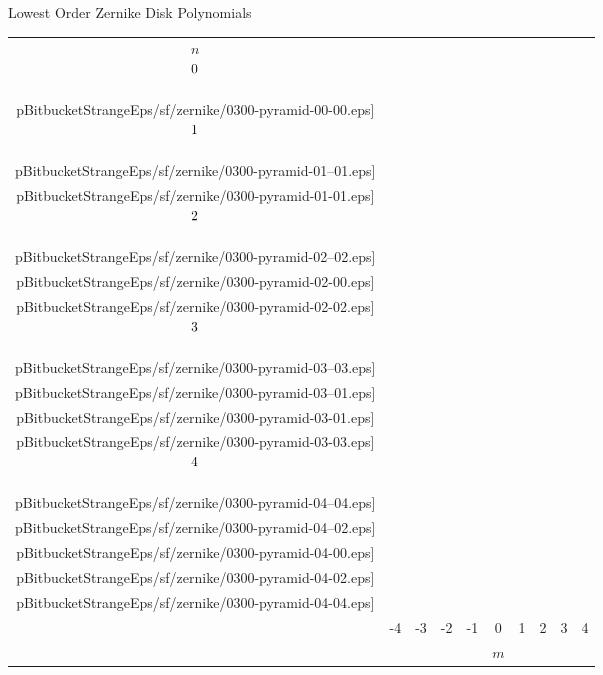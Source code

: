 % 

\begin{frame}{Lowest Order Zernike Disk Polynomials}
    \centering
  	\setlength\extrarowheight{-6pt}
    \setlength{\tabcolsep}{3pt}       %
    \begin{tabular}{cccccccccc}
				$n$ \\
 				$\raisebox{12pt}{0}$  &
        & & & & \texttt{[image: \\pBitbucketStrangeEps/sf/zernike/0300-pyramid-00-00.eps]} & & & & \\[-4pt]
 				$\raisebox{12pt}{1}$  &
        & & & \texttt{[image: \\pBitbucketStrangeEps/sf/zernike/0300-pyramid-01--01.eps]} &
        & \texttt{[image: \\pBitbucketStrangeEps/sf/zernike/0300-pyramid-01-01.eps]} & & & \\[-4pt]
 				$\raisebox{12pt}{2}$  &
        & & \texttt{[image: \\pBitbucketStrangeEps/sf/zernike/0300-pyramid-02--02.eps]} &
        & \texttt{[image: \\pBitbucketStrangeEps/sf/zernike/0300-pyramid-02-00.eps]} &
        & \texttt{[image: \\pBitbucketStrangeEps/sf/zernike/0300-pyramid-02-02.eps]} & & \\[-4pt]
 				$\raisebox{12pt}{3}$  &
        & \texttt{[image: \\pBitbucketStrangeEps/sf/zernike/0300-pyramid-03--03.eps]} &
        & \texttt{[image: \\pBitbucketStrangeEps/sf/zernike/0300-pyramid-03--01.eps]} &
        & \texttt{[image: \\pBitbucketStrangeEps/sf/zernike/0300-pyramid-03-01.eps]} &
        & \texttt{[image: \\pBitbucketStrangeEps/sf/zernike/0300-pyramid-03-03.eps]} & \\[-4pt]
				$\raisebox{12pt}{4}$  &
        \texttt{[image: \\pBitbucketStrangeEps/sf/zernike/0300-pyramid-04--04.eps]} &
        & \texttt{[image: \\pBitbucketStrangeEps/sf/zernike/0300-pyramid-04--02.eps]} &
        & \texttt{[image: \\pBitbucketStrangeEps/sf/zernike/0300-pyramid-04-00.eps]} &
        & \texttt{[image: \\pBitbucketStrangeEps/sf/zernike/0300-pyramid-04-02.eps]} &
        & \texttt{[image: \\pBitbucketStrangeEps/sf/zernike/0300-pyramid-04-04.eps]} \\[8pt]
 				& -4 & -3 & -2 & -1 & 0 & 1 & 2 & 3 & 4 \\
				&&&&& $m$
    \end{tabular}
\end{frame}
	
\endinput  %